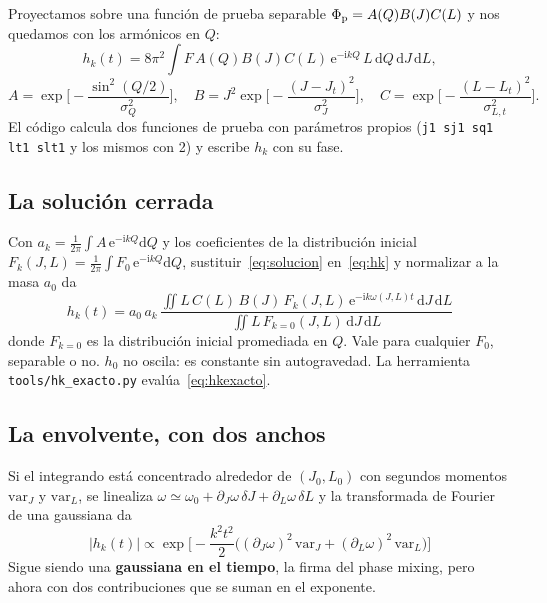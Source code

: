 \documentclass[11pt,a4paper]{article}
\newcommand{\dd}{\mathrm{d}}
\newcommand{\ee}{\mathrm{e}}
\newcommand{\ii}{\mathrm{i}}
\begin{document}
Proyectamos sobre una función de prueba separable $\Phi_{\rm p}=A(Q)B(J)C(L)$ y nos
quedamos con los armónicos en $Q$:
\begin{equation}
  h_k(t)=8\pi^2\int F\,A(Q)B(J)C(L)\,\ee^{-\ii kQ}\,L\,\dd Q\,\dd J\,\dd L ,
  \label{eq:hk}
\end{equation}
\begin{equation}
  A=\exp\Big[-\frac{\sin^2(Q/2)}{\sigma_Q^2}\Big],\quad
  B=J^2\exp\Big[-\frac{(J-J_t)^2}{\sigma_J^2}\Big],\quad
  C=\exp\Big[-\frac{(L-L_t)^2}{\sigma_{L,t}^2}\Big].
  \label{eq:prueba}
\end{equation}
El código calcula dos funciones de prueba con parámetros propios
(\texttt{j1 sj1 sq1 lt1 slt1} y los mismos con 2) y escribe $h_k$ con su fase.

\subsection{La solución cerrada}

Con $a_k=\frac1{2\pi}\int A\,\ee^{-\ii kQ}\dd Q$ y los coeficientes de la distribución
inicial $F_k(J,L)=\frac1{2\pi}\int F_0\,\ee^{-\ii kQ}\dd Q$, sustituir~\eqref{eq:solucion}
en~\eqref{eq:hk} y normalizar a la masa $a_0$ da
\begin{equation}
  \boxed{\;h_k(t)=a_0\,a_k\,
  \frac{\displaystyle\iint L\,C(L)\,B(J)\,F_k(J,L)\,\ee^{-\ii k\omega(J,L)t}\,\dd J\,\dd L}
       {\displaystyle\iint L\,F_{k=0}(J,L)\,\dd J\,\dd L}\;}
  \label{eq:hkexacto}
\end{equation}
donde $F_{k=0}$ es la distribución inicial promediada en $Q$.
Vale para cualquier $F_0$, separable o no. $h_0$ no oscila: es constante sin
autogravedad. La herramienta \texttt{tools/hk\_exacto.py} evalúa~\eqref{eq:hkexacto}.

\subsection{La envolvente, con dos anchos}

Si el integrando está concentrado alrededor de $(J_0,L_0)$ con segundos momentos
$\mathrm{var}_J$ y $\mathrm{var}_L$, se linealiza
$\omega\simeq\omega_0+\partial_J\omega\,\delta J+\partial_L\omega\,\delta L$ y la
transformada de Fourier de una gaussiana da
\begin{equation}
  \boxed{\;|h_k(t)|\propto\exp\Big[-\frac{k^2t^2}{2}\big(
     (\partial_J\omega)^2\,\mathrm{var}_J+(\partial_L\omega)^2\,\mathrm{var}_L\big)\Big]\;}
  \label{eq:gaussiana}
\end{equation}
Sigue siendo una \textbf{gaussiana en el tiempo}, la firma del phase mixing, pero ahora
con dos contribuciones que se suman en el exponente.
\end{document}
